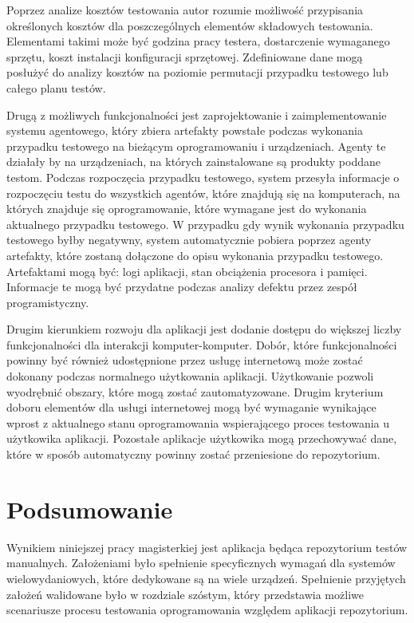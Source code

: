Poprzez analize kosztów testowania autor rozumie możliwość przypisania określonych kosztów dla poszczególnych elementów składowych testowania. Elementami takimi może być godzina pracy testera, dostarczenie wymaganego sprzętu, koszt instalacji konfiguracji sprzętowej. Zdefiniowane dane mogą posłużyć do analizy kosztów na poziomie permutacji przypadku testowego lub całego planu testów.

Drugą z możliwych funkcjonalności jest zaprojektowanie i zaimplementowanie systemu agentowego, który zbiera artefakty powstałe podczas wykonania przypadku testowego na bieżącym oprogramowaniu i urządzeniach. Agenty te działały by na urządzeniach, na których zainstalowane są produkty poddane testom. Podczas rozpoczęcia przypadku testowego, system przesyła informacje o rozpoczęciu testu do wszystkich agentów, które znajdują się na komputerach, na których znajduje się oprogramowanie, które wymagane jest do wykonania aktualnego przypadku testowego. W przypadku gdy wynik wykonania przypadku testowego byłby negatywny, system automatycznie pobiera poprzez agenty artefakty, które zostaną dołączone do opisu wykonania przypadku testowego. Artefaktami mogą być: logi aplikacji, stan obciążenia procesora i pamięci. Informacje te mogą być przydatne podczas analizy defektu przez zespół programistyczny.

Drugim kierunkiem rozwoju dla aplikacji jest dodanie dostępu do większej liczby funkcjonalności dla interakcji komputer-komputer. Dobór, które funkcjonalności powinny być również udostępnione przez usługę internetową może zostać dokonany podczas normalnego użytkowania aplikacji. Użytkowanie pozwoli wyodrębnić obszary, które mogą zostać zautomatyzowane. Drugim kryterium doboru elementów dla usługi internetowej mogą być wymaganie wynikające wprost z aktualnego stanu oprogramowania wspierającego proces testowania u użytkowika aplikacji. Pozostałe aplikacje użytkowika mogą przechowywać dane, które w sposób automatyczny powinny zostać przeniesione do repozytorium.



\section{Podsumowanie}

Wynikiem niniejszej pracy magisterkiej jest aplikacja będąca repozytorium testów manualnych. Założeniami było spełnienie specyficznych wymagań dla systemów wielowydaniowych, które dedykowane są na wiele urządzeń. Spełnienie przyjętych założeń walidowane było w rozdziale szóstym, który przedstawia możliwe scenariusze procesu testowania oprogramowania względem aplikacji repozytorium.

